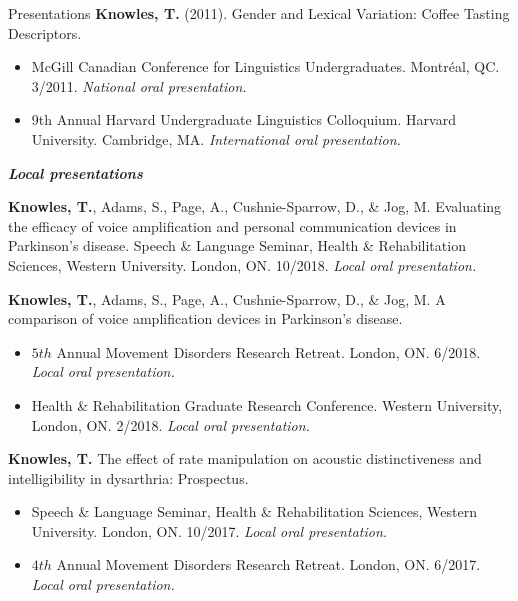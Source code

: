 \documentclass{resume} %
\begin{document}
\begin{rSection}{Presentations}
	{\bf Knowles, T.} (2011). Gender and Lexical Variation: Coffee Tasting Descriptors. 
	\begin{itemize}
				\renewcommand\labelitemi{$\cdot$}
		\item McGill Canadian Conference for Linguistics Undergraduates. Montr\'eal, QC. 3/2011. \emph{National oral presentation.}
		\item 9th Annual Harvard Undergraduate Linguistics Colloquium. Harvard University. Cambridge, MA. \emph{International oral presentation.}
	\end{itemize}






\begin{center}
	{\bf \emph{Local presentations}}
\end{center}

	{\bf Knowles, T.}, Adams, S., Page, A., Cushnie-Sparrow, D., \& Jog, M. Evaluating the efficacy of voice amplification and personal communication devices in Parkinson's disease. Speech \& Language Seminar, Health \& Rehabilitation Sciences, Western University. London, ON. 10/2018. \emph{Local oral presentation.}

	{\bf Knowles, T.}, Adams, S., Page, A., Cushnie-Sparrow, D., \& Jog, M. A comparison of voice amplification devices in Parkinson's disease. 
		\begin{itemize}
			\renewcommand\labelitemi{$\cdot$}
			\item $5th$ Annual Movement Disorders Research Retreat. London, ON. 6/2018. \emph{Local oral presentation.}
			\item Health \& Rehabilitation  Graduate Research Conference. Western University, London, ON. 2/2018. \emph{Local oral presentation.}
		\end{itemize}
		
	{\bf Knowles, T.} The effect of rate manipulation on acoustic distinctiveness and intelligibility in dysarthria: Prospectus. 
	\begin{itemize}
		\renewcommand\labelitemi{$\cdot$}
		\item Speech \& Language Seminar, Health \& Rehabilitation Sciences, Western University. London, ON. 10/2017. \emph{Local oral presentation.}
		\item $4th$ Annual Movement Disorders Research Retreat. London, ON. 6/2017. \emph{Local oral presentation.}
	\end{itemize}
	

\end{rSection}
\end{document}
